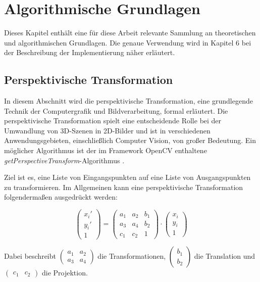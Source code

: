 \documentclass[
  ngerman,
  a4paper,  %
  twoside,  %
  bibliography=totoc,
  headsepline,
  cleardoublepage=empty,
  parskip=half,
  draft=false
]{scrbook}
\begin{document}
\section{Algorithmische Grundlagen}
Dieses Kapitel enthält eine für diese Arbeit relevante Sammlung an theoretischen und algorithmischen Grundlagen. Die genaue Verwendung wird in Kapitel 6 bei der Beschreibung der Implementierung näher erläutert.
\subsection{Perspektivische Transformation}
In diesem Abschnitt wird die perspektivische Transformation, eine grundlegende Technik der Computergrafik und Bildverarbeitung, formal erläutert. Die perspektivische Transformation spielt eine entscheidende Rolle bei der Umwandlung von 3D-Szenen in 2D-Bilder und ist in verschiedenen Anwendungsgebieten, einschließlich Computer Vision, von großer Bedeutung. Ein möglicher Algorithmus ist der im Framework OpenCV enthaltene \textit{getPerspectiveTransform}-Algorithmus \cite{src_persp_trans}.

Ziel ist es, eine Liste von Eingangspunkten auf eine Liste von Ausgangspunkten zu transformieren. Im Allgemeinen kann eine perspektivische Transformation folgendermaßen ausgedrückt werden:

\begin{equation}
  \begin{pmatrix} x_i'\\ y_i'\\ 1\end{pmatrix}=\begin{pmatrix}
    a_1 & a_2 & b_1 \\
    a_3 & a_4 & b_2 \\
    c_1 & c_2 & 1
  \end{pmatrix}\cdot\begin{pmatrix}
    x_i \\y_i\\1
  \end{pmatrix}
\end{equation}

Dabei beschreibt $\begin{pmatrix}
    a_1 & a_2 \\
    a_3 & a_4
  \end{pmatrix}$ die Transformationen, $\begin{pmatrix}
    b_1 \\
    b_2
  \end{pmatrix}$ die Translation und $\begin{pmatrix}
    c_1 & c_2
  \end{pmatrix}$ die Projektion.
\end{document}
